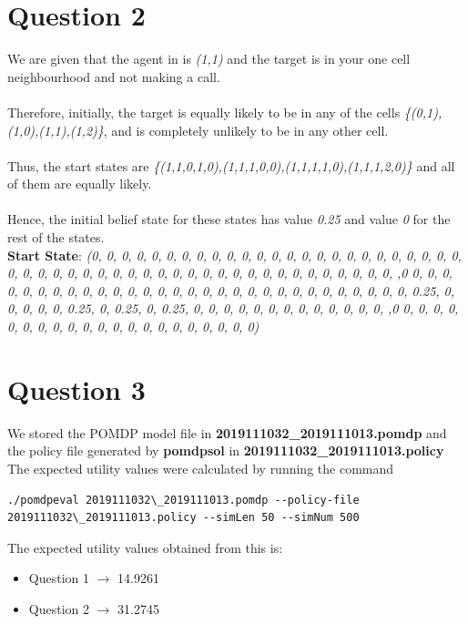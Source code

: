 \documentclass[12pt]{report}
\theoremstyle{definition}
\theoremstyle{plain}
\begin{document}
\section*{Question 2}
We are given that the agent in is \emph{(1,1)} and the target is in your one cell neighbourhood and not making a call. \\ \\
Therefore, initially, the target is equally likely to be in any of the cells \emph{\{(0,1),(1,0),(1,1),(1,2)\}}, and is completely unlikely to be in any other cell. \\ \\
Thus, the start states are \emph{\{(1,1,0,1,0),(1,1,1,0,0),(1,1,1,1,0),(1,1,1,2,0)\}} and all of them are equally likely. \\ \\
Hence, the initial belief state for these states has value \emph{0.25} and value \emph{0} for the rest of the states. \\
\textbf{Start State}: \emph{(0, 0, 0, 0, 0, 0, 0, 0, 0, 0, 0, 0, 0, 0, 0, 0, 0, 0, 0, 0, 0, 0, 0, 0, 0, 0, 0, 0, 0, 0, 0, 0, 0, 0, 0, 0, 0, 0, 0, 0, 0, 0, 0, 0, 0, 0, 0, 0, 0, 0, 0, ,0 0, 0, 0, 0, 0, 0, 0, 0, 0, 0, 0, 0, 0, 0, 0, 0, 0, 0, 0, 0, 0, 0, 0, 0, 0, 0, 0, 0, 0, 0, 0.25, 0, 0, 0, 0, 0, 0.25, 0, 0.25, 0, 0.25, 0, 0, 0, 0, 0, 0, 0, 0, 0, 0, 0, 0, 0, ,0 0, 0, 0, 0, 0, 0, 0, 0, 0, 0, 0, 0, 0, 0, 0, 0, 0, 0, 0, 0, 0)}
\vspace{0.2cm} \\ \hline
\section*{Question 3}
We stored the POMDP model file in \textbf{2019111032\_2019111013.pomdp} and the policy file generated by \textbf{pomdpsol} in \textbf{2019111032\_2019111013.policy} \\
The expected utility values were calculated by running the command \\
\begin{lstlisting}[breaklines]
  ./pomdpeval 2019111032\_2019111013.pomdp --policy-file 2019111032\_2019111013.policy --simLen 50 --simNum 500
\end{lstlisting}
The expected utility values obtained from this is:
\begin{itemize}
    \item Question 1 $\rightarrow$ 14.9261
    \item Question 2 $\rightarrow$ 31.2745
\end{itemize}
\end{document}
